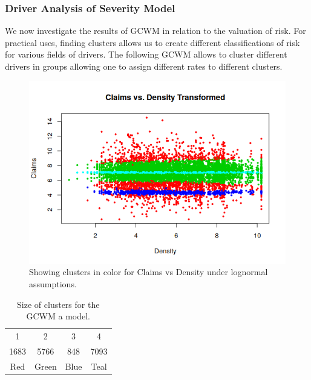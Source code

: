 \documentclass[11pt,letterpaper]{article}
\numberwithin{equation}{section}
\numberwithin{equation}{section}
\numberwithin{equation}{section}
\begin{document}
\subsubsection{Driver Analysis of Severity Model}

	We now investigate the results of GCWM in relation to the valuation of risk. For practical uses, finding clusters allows us to create different classifications of risk for various fields of drivers. The following GCWM allows to cluster different drivers in groups allowing one to assign different rates to different clusters. 
\begin{figure}[!htb]
\begin{center}
\includegraphics[scale=0.83]{claims_v_density.png}
\end{center}
\caption{Showing clusters in color for Claims vs Density under lognormal assumptions.}
\label{fig:vet1}
\end{figure}
\begin{table}[!htb]
\centering
\caption{Size of clusters for the GCWM a model.}
\label{table:sizeSev}
\begin{tabular}{cccc}
\hline\hline 
1   & 2  &  3   & 4    \\
1683 & 5766 & 848 & 7093 \\
Red & Green & Blue & Teal \\
\hline\hline
\end{tabular}
\end{table}
\end{document}

